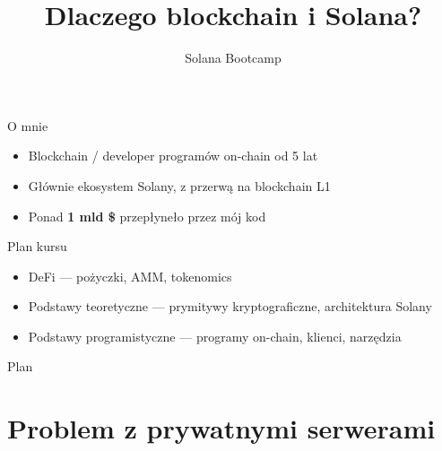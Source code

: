 

\usepackage[utf8]{inputenc}
\usepackage[T1]{fontenc}

\title{Dlaczego blockchain i Solana?}
\subtitle{Solana Bootcamp}
\author{}



\maketitleframe

\begin{frame}{O mnie}
  \begin{itemize}
    \item Blockchain / developer programów on-chain od 5 lat
    \item Głównie ekosystem Solany, z przerwą na blockchain L1
    \item Ponad \textbf{1 mld \$} przepłyneło przez mój kod
  \end{itemize}
\end{frame}

\begin{frame}{Plan kursu}
  \begin{itemize}
    \item DeFi --- pożyczki, AMM, tokenomics
    \item Podstawy teoretyczne --- prymitywy kryptograficzne, architektura Solany
    \item Podstawy programistyczne --- programy on-chain, klienci, narzędzia
  \end{itemize}
\end{frame}

\begin{frame}{Plan}
  \tableofcontents
\end{frame}

\section{Problem z prywatnymi serwerami}

